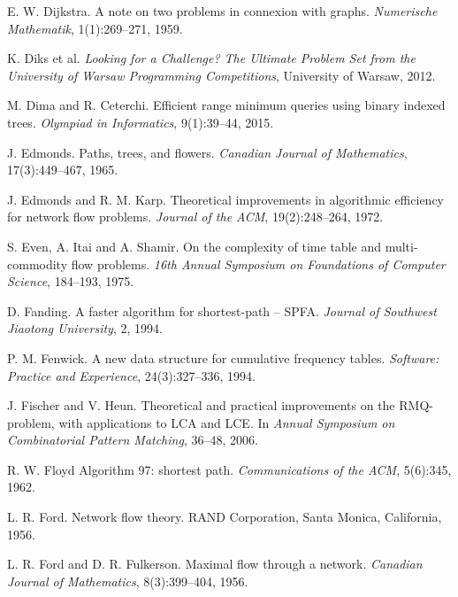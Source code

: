 \begin{thebibliography}{9}
  E. W. Dijkstra.
  A note on two problems in connexion with graphs.
  \emph{Numerische Mathematik}, 1(1):269--271, 1959.

  K. Diks et al.
  \emph{Looking for a Challenge? The Ultimate Problem Set from
  the University of Warsaw Programming Competitions}, University of Warsaw, 2012.



  M. Dima and R. Ceterchi.
  Efficient range minimum queries using binary indexed trees.
  \emph{Olympiad in Informatics}, 9(1):39--44, 2015.

  J. Edmonds.
  Paths, trees, and flowers.
  \emph{Canadian Journal of Mathematics}, 17(3):449--467, 1965.

  J. Edmonds and R. M. Karp.
  Theoretical improvements in algorithmic efficiency for network flow problems.
  \emph{Journal of the ACM}, 19(2):248--264, 1972.

  S. Even, A. Itai and A. Shamir.
  On the complexity of time table and multi-commodity flow problems.
  \emph{16th Annual Symposium on Foundations of Computer Science}, 184--193, 1975.

  D. Fanding.
  A faster algorithm for shortest-path -- SPFA.
  \emph{Journal of Southwest Jiaotong University}, 2, 1994.

  P. M. Fenwick.
  A new data structure for cumulative frequency tables.
  \emph{Software: Practice and Experience}, 24(3):327--336, 1994.

  J. Fischer and V. Heun.
  Theoretical and practical improvements on the RMQ-problem, with applications to LCA and LCE.
  In \emph{Annual Symposium on Combinatorial Pattern Matching}, 36--48, 2006.

  R. W. Floyd
  Algorithm 97: shortest path.
  \emph{Communications of the ACM}, 5(6):345, 1962.

  L. R. Ford.
  Network flow theory.
  RAND Corporation, Santa Monica, California, 1956.

  L. R. Ford and D. R. Fulkerson.
  Maximal flow through a network.
  \emph{Canadian Journal of Mathematics}, 8(3):399--404, 1956.


\end{thebibliography}
